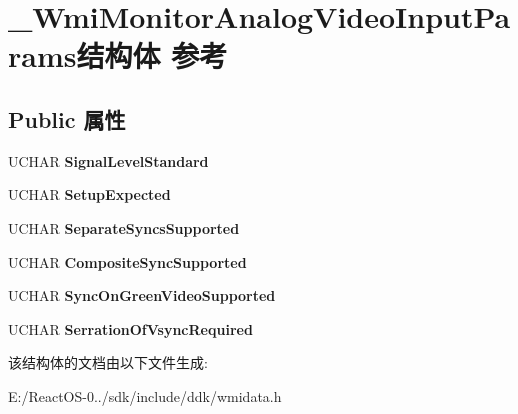 \hypertarget{struct___wmi_monitor_analog_video_input_params}{}\section{\+\_\+\+Wmi\+Monitor\+Analog\+Video\+Input\+Params结构体 参考}
\label{struct___wmi_monitor_analog_video_input_params}
\subsection*{Public 属性}
\begin{DoxyCompactItemize}
\item 
\mbox{\label{struct___wmi_monitor_analog_video_input_params_ad8a8425a9ceee986907e7986b53629c1}} 
U\+C\+H\+AR {\bfseries Signal\+Level\+Standard}
\item 
\mbox{\label{struct___wmi_monitor_analog_video_input_params_a078b21e745dc72384541073729e5c333}} 
U\+C\+H\+AR {\bfseries Setup\+Expected}
\item 
\mbox{\label{struct___wmi_monitor_analog_video_input_params_ac337559a8d14e8ae50a112284d362e97}} 
U\+C\+H\+AR {\bfseries Separate\+Syncs\+Supported}
\item 
\mbox{\label{struct___wmi_monitor_analog_video_input_params_aab69086f17c8a28de8205bdbc8485495}} 
U\+C\+H\+AR {\bfseries Composite\+Sync\+Supported}
\item 
\mbox{\label{struct___wmi_monitor_analog_video_input_params_aecd988df85e8dde44634be146a2a08c0}} 
U\+C\+H\+AR {\bfseries Sync\+On\+Green\+Video\+Supported}
\item 
\mbox{\label{struct___wmi_monitor_analog_video_input_params_aa737c717a9db2a68d9fdd0595870f333}} 
U\+C\+H\+AR {\bfseries Serration\+Of\+Vsync\+Required}
\end{DoxyCompactItemize}


该结构体的文档由以下文件生成\+:\begin{DoxyCompactItemize}
\item 
E\+:/\+React\+O\+S-\/0../sdk/include/ddk/wmidata.\+h\end{DoxyCompactItemize}
